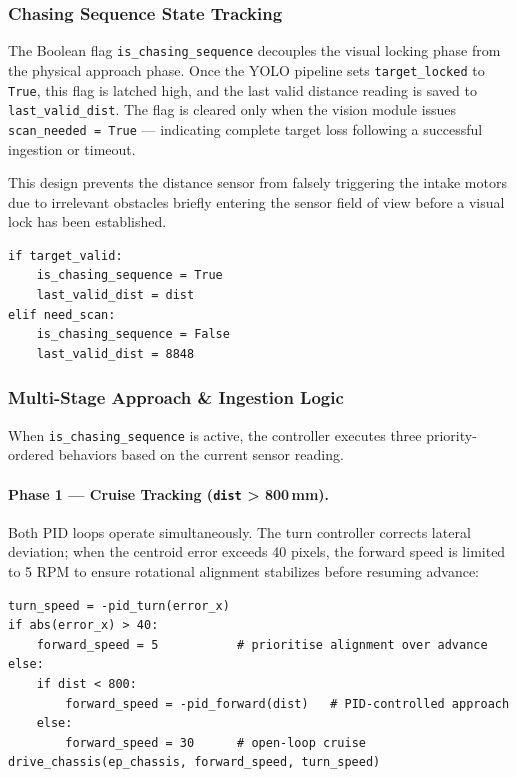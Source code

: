 \subsubsection{Chasing Sequence State Tracking}

The Boolean flag \texttt{is\_chasing\_sequence} decouples the visual locking phase from the physical approach phase.
Once the YOLO pipeline sets \texttt{target\_locked} to \texttt{True}, this flag is latched high,
and the last valid distance reading is saved to \texttt{last\_valid\_dist}.
The flag is cleared only when the vision module issues \texttt{scan\_needed = True} —
indicating complete target loss following a successful ingestion or timeout.

This design prevents the distance sensor from falsely triggering the intake motors due to
irrelevant obstacles briefly entering the sensor field of view before a visual lock has been established.

\begin{verbatim}
if target_valid:
    is_chasing_sequence = True
    last_valid_dist = dist
elif need_scan:
    is_chasing_sequence = False
    last_valid_dist = 8848
\end{verbatim}

\subsubsection{Multi-Stage Approach \& Ingestion Logic}

When \texttt{is\_chasing\_sequence} is active, the controller executes three priority-ordered behaviors
based on the current sensor reading.

\paragraph{Phase 1 --- Cruise Tracking (\texttt{dist} > 800\,mm).}
Both PID loops operate simultaneously. The turn controller corrects lateral deviation; when the centroid error exceeds 40 pixels,
the forward speed is limited to 5 RPM to ensure rotational alignment stabilizes before resuming advance:

\begin{verbatim}
turn_speed = -pid_turn(error_x)
if abs(error_x) > 40:
    forward_speed = 5           # prioritise alignment over advance
else:
    if dist < 800:
        forward_speed = -pid_forward(dist)   # PID-controlled approach
    else:
        forward_speed = 30      # open-loop cruise
drive_chassis(ep_chassis, forward_speed, turn_speed)
\end{verbatim}

